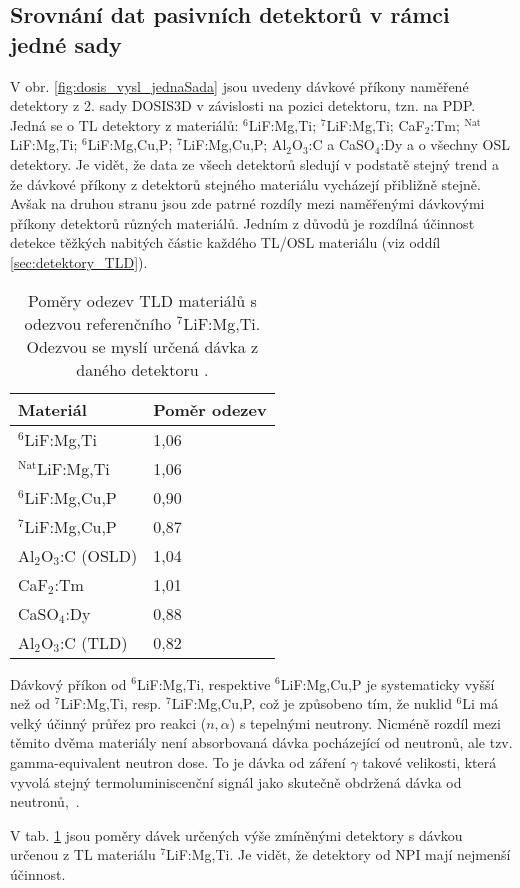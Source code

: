 \subsection{Srovnání dat pasivních detektorů v rámci jedné sady}
V obr. \ref{fig:dosis_vysl_jednaSada} jsou uvedeny dávkové příkony naměřené detektory z 2. sady DOSIS3D v závislosti na pozici detektoru, tzn. na PDP. Jedná se o TL detektory z materiálů: $^6$LiF:Mg,Ti; $^7$LiF:Mg,Ti; CaF$_2$:Tm; $^{\text{Nat}}$LiF:Mg,Ti; $^6$LiF:Mg,Cu,P; $^7$LiF:Mg,Cu,P; Al$_2$O$_3$:C a CaSO$_4$:Dy a o všechny OSL detektory. Je vidět, že data ze všech detektorů sledují v podstatě stejný trend a že dávkové příkony z detektorů stejného materiálu vycházejí přibližně stejně. Avšak na druhou stranu jsou zde patrné rozdíly mezi naměřenými dávkovými příkony detektorů různých materiálů. Jedním z důvodů je rozdílná účinnost detekce těžkých nabitých částic každého TL/OSL materiálu (viz oddíl \ref{sec:detektory_TLD}).
\begin{table}[H]
  \centering
  \caption{Poměry odezev TLD materiálů s odezvou referenčního $^7$LiF:Mg,Ti. Odezvou se myslí určená dávka z daného detektoru \cite{dosis}.}
  \label{tab:dosis_TLD_ratio}
  \begin{tabular}{ll}
	\toprule
	Materiál & Poměr odezev\\
	\midrule
$^6$LiF:Mg,Ti		&1,06\\
$^{\text{Nat}}$LiF:Mg,Ti	&1,06\\
$^6$LiF:Mg,Cu,P		&0,90\\
$^7$LiF:Mg,Cu,P		&0,87\\
Al$_2$O$_3$:C (OSLD)&1,04\\ 
CaF$_2$:Tm			&1,01\\
CaSO$_4$:Dy			&0,88\\
Al$_2$O$_3$:C (TLD)	&0,82\\
\bottomrule
  \end{tabular}
\end{table}

Dávkový příkon od $^6$LiF:Mg,Ti, respektive $^6$LiF:Mg,Cu,P je systematicky vyšší než od $^7$LiF:Mg,Ti, resp. $^7$LiF:Mg,Cu,P, což je způsobeno tím, že nuklid $^6$Li má velký účinný průřez pro reakci ($n,\alpha$) s tepelnými neutrony. Nicméně rozdíl mezi těmito dvěma materiály není absorbovaná dávka pocházející od neutronů, ale tzv. gamma-equivalent neutron dose. To je dávka od záření $\gamma$ takové velikosti, která vyvolá stejný termoluminiscenční signál jako skutečně obdržená dávka od neutronů,~\cite{dosis}.

V tab. \ref{tab:dosis_TLD_ratio} jsou poměry dávek určených výše zmíněnými detektory s dávkou určenou z TL materiálu $^7$LiF:Mg,Ti. Je vidět, že detektory od NPI mají nejmenší účinnost.

